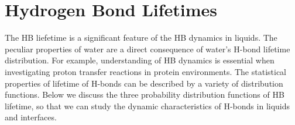 \section{Hydrogen Bond Lifetimes}
The HB liefetime is a significant feature of the HB dynamics in liquids. 
The peculiar properties of water are a direct consequence of water's H-bond lifetime distribution.\cite{Lee2007,Sciortino1989,Sciortino1990prl} 
For example, understanding of HB dynamics is essential when investigating proton transfer reactions in protein environments.\cite{Ishikita2013}  
The statistical properties of lifetime of H-bonds can be described by a variety of distribution functions.{\cite{Rapaport1983, Tanaka1983, Geiger1984,Naberukhin2009}
Below we discuss the three probability distribution functions of HB lifetime, so that we can study the dynamic characteristics of H-bonds in liquids and interfaces.
%
}
